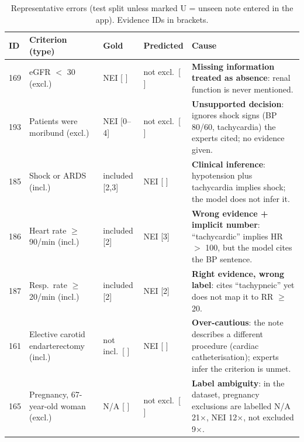 \documentclass[conference]{IEEEtran}
\begin{document}
\begin{table}[t]
\centering
\caption{Label error types (each wrong label counted once). NEI = not enough information.}
\label{tab:taxonomy}
\footnotesize
{}
\end{table}

\begin{table}[t]
\centering
\caption{Representative errors (test split unless marked U = unseen note entered in the app). Evidence IDs in brackets.}
\label{tab:errors}
\footnotesize
\begin{tabular}{p{0.6cm}p{4.6cm}p{1.9cm}p{1.9cm}p{6.6cm}}
\toprule
ID & Criterion (type) & Gold & Predicted & Cause \\
\midrule
169 & eGFR $<$ 30 (excl.) & NEI [ ] & not excl.\ [ ] & \textbf{Missing information treated as absence}: renal function is never mentioned. \\
193 & Patients were moribund (excl.) & NEI [0--4] & not excl.\ [ ] & \textbf{Unsupported decision}: ignores shock signs (BP 80/60, tachycardia) the experts cited; no evidence given. \\
185 & Shock or ARDS (incl.) & included [2,3] & NEI [ ] & \textbf{Clinical inference}: hypotension plus tachycardia implies shock; the model does not infer it. \\
186 & Heart rate $\ge$ 90/min (incl.) & included [2] & NEI [3] & \textbf{Wrong evidence + implicit number}: ``tachycardic'' implies HR $>$ 100, but the model cites the BP sentence. \\
187 & Resp.\ rate $\ge$ 20/min (incl.) & included [2] & NEI [2] & \textbf{Right evidence, wrong label}: cites ``tachypneic'' yet does not map it to RR $\ge$ 20. \\
161 & Elective carotid endarterectomy (incl.) & not incl.\ [ ] & NEI [ ] & \textbf{Over-cautious}: the note describes a different procedure (cardiac catheterisation); experts infer the criterion is unmet. \\
165 & Pregnancy, 67-year-old woman (excl.) & N/A [ ] & not excl.\ [ ] & \textbf{Label ambiguity}: in the dataset, pregnancy exclusions are labelled N/A 21$\times$, NEI 12$\times$, not excluded 9$\times$. \\

\end{tabular}
\end{table}
\end{document}
